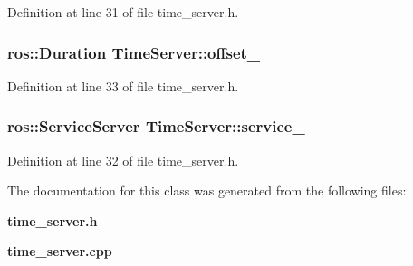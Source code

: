 \-Definition at line 31 of file time\-\_\-server.\-h.

\subsubsection[{offset\-\_\-}]{\setlength{\rightskip}{0pt plus 5cm}ros\-::\-Duration {\bf \-Time\-Server\-::offset\-\_\-}\hspace{0.3cm}{\ttfamily  [private]}}\label{classTimeServer_abf5c6991563319da5ea6ec79893d9605}


\-Definition at line 33 of file time\-\_\-server.\-h.

\subsubsection[{service\-\_\-}]{\setlength{\rightskip}{0pt plus 5cm}ros\-::\-Service\-Server {\bf \-Time\-Server\-::service\-\_\-}\hspace{0.3cm}{\ttfamily  [private]}}\label{classTimeServer_ad751f7e701fdf12cb9be7fe08dfc838d}


\-Definition at line 32 of file time\-\_\-server.\-h.



\-The documentation for this class was generated from the following files\-:\begin{DoxyCompactItemize}
\item 
{\bf time\-\_\-server.\-h}\item 
{\bf time\-\_\-server.\-cpp}\end{DoxyCompactItemize}
